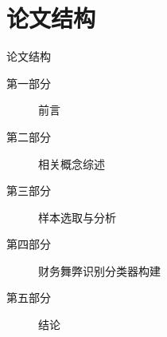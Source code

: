 \section{论文结构}

\begin{frame}[fragile]{论文结构}
    \begin{description}
        \item[第一部分] 前言
        \item[第二部分] 相关概念综述
        \item[第三部分] 样本选取与分析
        \item[第四部分] 财务舞弊识别分类器构建
        \item[第五部分] 结论
    \end{description}
\end{frame}
